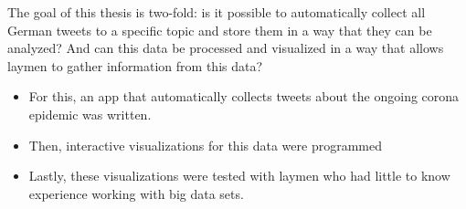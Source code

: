 The goal of this thesis is two-fold: is it possible to automatically collect all German tweets to a specific topic and store them in a way that they can be analyzed? And can this data be processed and visualized in a way that allows laymen to gather information from this data?

\begin{itemize}
    \item For this, an app that automatically collects tweets about the ongoing corona epidemic was written.
    \item Then, interactive visualizations for this data were programmed
    \item Lastly, these visualizations were tested with laymen who had little to know experience working with big data sets.
\end{itemize}